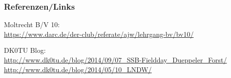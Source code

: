 \renewcommand{\refname}{Referenzen}

\begin{frame}
  \frametitle{Referenzen/Links}
  \hypertarget{refs}{}
  \footnotesize

  \begin{thebibliography}{}
     Moltrecht B/V 10: \\
      \url{https://www.darc.de/der-club/referate/ajw/lehrgang-bv/bv10/}

      DK0TU Blog: \\
      \url{http://www.dk0tu.de/blog/2014/09/07_SSB-Fieldday_Dueppeler_Forst/}
      \url{http://www.dk0tu.de/blog/2014/05/10_LNDW/}
  \end{thebibliography}

\end{frame}


